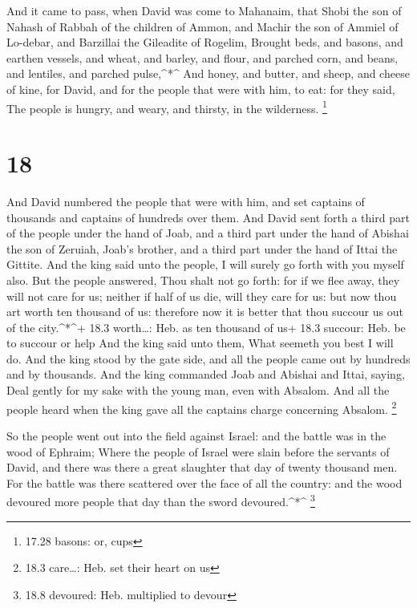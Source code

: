  And it came to pass, when David was come to Mahanaim, that
Shobi the son of Nahash of Rabbah of the children of Ammon, and Machir
the son of Ammiel of Lo-debar, and Barzillai the Gileadite of Rogelim,
 Brought beds, and basons, and earthen vessels, and wheat,
and barley, and flour, and parched corn, and beans, and lentiles, and
parched pulse,\^{}*\^{}  And honey, and butter, and sheep,
and cheese of kine, for David, and for the people that were with him, to
eat: for they said, The people is hungry, and weary, and thirsty, in the
wilderness. \footnote{17.28 basons: or, cups}

\hypertarget{section-17}{%
\section{18}\label{section-17}}

 And David numbered the people that were with him, and set
captains of thousands and captains of hundreds over them. 
And David sent forth a third part of the people under the hand of Joab,
and a third part under the hand of Abishai the son of Zeruiah, Joab's
brother, and a third part under the hand of Ittai the Gittite. And the
king said unto the people, I will surely go forth with you myself also.
 But the people answered, Thou shalt not go forth: for if we
flee away, they will not care for us; neither if half of us die, will
they care for us: but now thou art worth ten thousand of us: therefore
now it is better that thou succour us out of the city.\^{}*\^{}+ 18.3
worth\ldots: Heb. as ten thousand of us+ 18.3 succour: Heb. be to
succour or help  And the king said unto them, What seemeth
you best I will do. And the king stood by the gate side, and all the
people came out by hundreds and by thousands.  And the king
commanded Joab and Abishai and Ittai, saying, Deal gently for my sake
with the young man, even with Absalom. And all the people heard when the
king gave all the captains charge concerning Absalom. \footnote{18.3
  care\ldots: Heb. set their heart on us}

 So the people went out into the field against Israel: and
the battle was in the wood of Ephraim;  Where the people of
Israel were slain before the servants of David, and there was there a
great slaughter that day of twenty thousand men.  For the
battle was there scattered over the face of all the country: and the
wood devoured more people that day than the sword devoured.\^{}*\^{}
\footnote{18.8 devoured: Heb. multiplied to devour}

